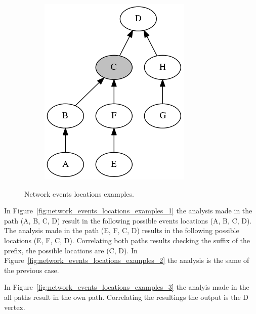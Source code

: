 \begin{figure}[H]
{\begin{subfigure}[b]{0.3\textwidth}
            \includegraphics[width=\textwidth]{./figures/methodology/spatial_time_correlation/graph4.png}
            \caption{}\label{fig:network_events_locations_examples_4}
        \end{subfigure}%
    }
    \caption{Network events locations examples.}
\label{fig:network_events_locations_examples}
\end{figure}%

In Figure~\ref{fig:network_events_locations_examples_1} the analysis made
in the path (A, B, C, D) result in the following possible events locations (A,
B, C, D). The analysis made in the path (E, F, C, D) results in the following
possible locations (E, F, C, D). Correlating both paths results checking the
suffix of the prefix, the possible locations are (C, D). In
Figure~\ref{fig:network_events_locations_examples_2} the analysis is the same
of the previous case.

In Figure~\ref{fig:network_events_locations_examples_3} the analyis made in the
all paths result in the own path. Correlating the resultings the output is the
D vertex.

